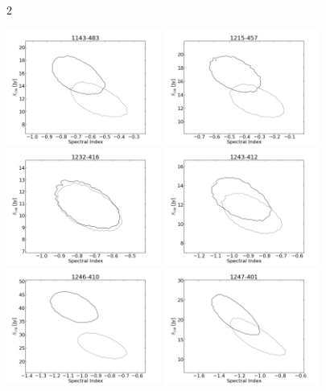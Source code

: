 \documentclass[preprint]{aastex}
\begin{document}
\begin{figure}[htbp]2\begin{center}
\includegraphics[width=2in]{plots/1143-483_SI_MCMC.png} %
\includegraphics[width=2in]{plots/1215-457_SI_MCMC.png} %
\includegraphics[width=2in]{plots/1232-416_SI_MCMC.png} %
\includegraphics[width=2in]{plots/1243-412_SI_MCMC.png} %
\includegraphics[width=2in]{plots/1246-410_SI_MCMC.png} %
\includegraphics[width=2in]{plots/1247-401_SI_MCMC.png} %

\end{center}
\end{figure}
\end{document}
